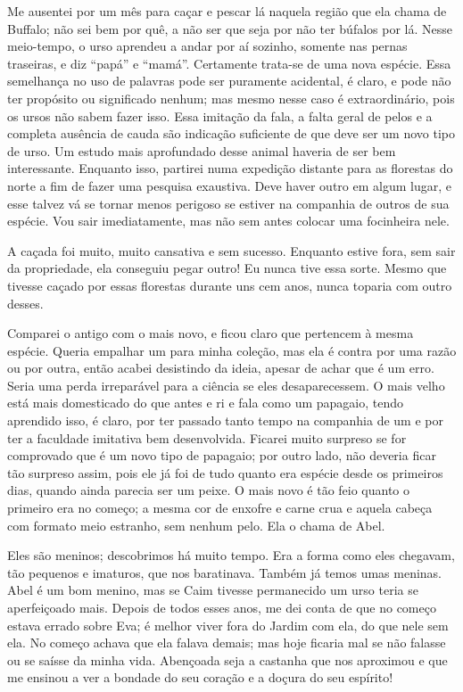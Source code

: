   Me ausentei por um mês para caçar e pescar lá naquela
região que ela chama de Buffalo; não sei bem por quê, a não ser que seja por
não ter búfalos por lá. Nesse meio-tempo, o urso aprendeu a andar por aí
sozinho, somente nas pernas traseiras, e diz “papá” e “mamá”. Certamente
trata-se de uma nova espécie. Essa semelhança no uso de palavras pode ser
puramente acidental, é claro, e pode não ter propósito ou significado nenhum;
mas mesmo nesse caso é extraordinário, pois os ursos não sabem
fazer isso. Essa imitação da fala, a falta geral de pelos e a completa
ausência de cauda são indicação suficiente de que deve ser um novo tipo de urso.
Um estudo mais aprofundado desse animal haveria de ser bem interessante. Enquanto
isso, partirei numa expedição distante para as florestas do norte a fim de fazer
uma pesquisa exaustiva. Deve haver outro em algum lugar, e esse talvez vá se
tornar menos perigoso se estiver na companhia de outros de sua espécie. Vou
sair imediatamente, mas não sem antes colocar uma focinheira nele.

  A caçada foi muito, muito cansativa e sem sucesso.
Enquanto estive fora, sem sair da propriedade, ela conseguiu pegar outro! Eu
nunca tive essa sorte. Mesmo que tivesse caçado por essas florestas
durante uns cem anos, nunca toparia com outro desses.

   Comparei o antigo com o mais novo, e  ficou claro que pertencem
à mesma espécie. Queria empalhar um para minha coleção, mas ela é contra por uma razão ou por outra, 
então acabei desistindo da ideia, apesar de achar
que é um erro. Seria uma perda irreparável para a ciência se eles
desaparecessem. O mais velho está mais domesticado do que antes e ri e fala
como um papagaio, tendo aprendido isso, é claro, por ter passado tanto tempo na
companhia de um e por ter a faculdade imitativa bem desenvolvida. Ficarei muito
surpreso se for comprovado que é um novo tipo de papagaio; por outro lado, não
deveria ficar tão surpreso assim, pois ele já foi de tudo quanto era espécie desde os
primeiros dias, quando ainda parecia ser um peixe. O mais novo é tão feio
quanto o primeiro era no começo; a mesma cor de enxofre e carne crua e aquela
cabeça com formato meio estranho, sem nenhum pelo. Ela o chama de Abel.

   Eles são meninos; descobrimos há muito tempo. Era a
forma como eles chegavam, tão pequenos e imaturos, que nos baratinava. Também já
temos umas meninas. Abel é um bom menino, mas se Caim tivesse permanecido um
urso teria se aperfeiçoado mais. Depois de todos esses anos, me dei conta de que
no começo estava errado sobre Eva; é melhor viver fora do Jardim com ela,
do que nele sem ela. No começo achava que ela falava demais; mas hoje ficaria
mal se não falasse ou se saísse da minha vida. Abençoada seja a castanha que
nos aproximou e que me ensinou a ver a bondade do seu coração e a doçura do seu
espírito!

